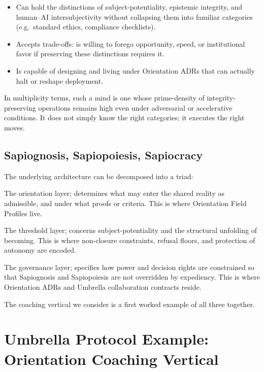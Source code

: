 \documentclass[11pt]{article}
\begin{document}
\begin{itemize}[nosep]
  \item Can hold the distinctions of subject-potentiality, epistemic integrity, and human--AI intersubjectivity without collapsing them into familiar categories (e.g.\ standard ethics, compliance checklists).
  \item Accepts trade-offs: is willing to forego opportunity, speed, or institutional favor if preserving these distinctions requires it.
  \item Is capable of designing and living under Orientation ADRs that can actually halt or reshape deployment.
\end{itemize}

In multiplicity terms, such a mind is one whose prime-density of integrity-preserving operations remains high even under adversarial or accelerative conditions. It does not simply know the right categories; it executes the right moves.

\subsection{Sapiognosis, Sapiopoiesis, Sapiocracy}

The underlying architecture can be decomposed into a triad:

\begin{description}[style=nextline]
  \item[Sapiognosis] The orientation layer; determines what may enter the shared reality as admissible, and under what proofs or criteria. This is where Orientation Field Profiles live.
  \item[Sapiopoiesis] The threshold layer; concerns subject-potentiality and the structural unfolding of becoming. This is where non-closure constraints, refusal floors, and protection of autonomy are encoded.
  \item[Sapiocracy] The governance layer; specifies how power and decision rights are constrained so that Sapiognosis and Sapiopoiesis are not overridden by expediency. This is where Orientation ADRs and Umbrella collaboration contracts reside.
\end{description}

The coaching vertical we consider is a first worked example of all three together.

\newpage

\section{Umbrella Protocol Example: Orientation Coaching Vertical}
\end{document}
